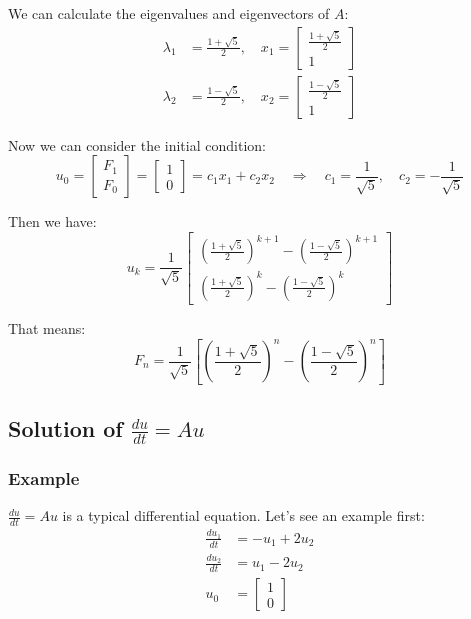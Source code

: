 \documentclass[12pt]{ctexart}
\begin{document}
We can calculate the eigenvalues and eigenvectors of $A$:
\begin{align*}
  \lambda_1 &= \frac{1 + \sqrt{5}}{2}, \quad
  x_1 = \begin{bmatrix}
    \frac{1 + \sqrt{5}}{2} \\
    1
  \end{bmatrix} \\
  \lambda_2 &= \frac{1 - \sqrt{5}}{2}, \quad
  x_2 = \begin{bmatrix}
    \frac{1 - \sqrt{5}}{2} \\
    1
  \end{bmatrix}
\end{align*}

Now we can consider the initial condition:
\[
  u_0 = \begin{bmatrix}
    F_1 \\
    F_0
  \end{bmatrix} =
  \begin{bmatrix}
    1 \\
    0
  \end{bmatrix} =
  c_1 x_1 + c_2 x_2
  \quad \Rightarrow \quad
  c_1 = \frac{1}{\sqrt{5}}, \quad c_2 = -\frac{1}{\sqrt{5}}
\]

Then we have:
\[
  u_k = \frac{1}{\sqrt{5}} \begin{bmatrix}
    \left(\frac{1 + \sqrt{5}}{2}\right)^{k+1} - \left(\frac{1 - \sqrt{5}}{2}\right)^{k+1} \\
    \left(\frac{1 + \sqrt{5}}{2}\right)^k - \left(\frac{1 - \sqrt{5}}{2}\right)^k
  \end{bmatrix}
\]

That means:
\[
  F_n = \frac{1}{\sqrt{5}} \left[
    \left(\frac{1 + \sqrt{5}}{2}\right)^n -
    \left(\frac{1 - \sqrt{5}}{2}\right)^n
  \right]
\]

\subsection{\textbf{Solution of $\frac{du}{dt} = Au$}}
\subsubsection{\textbf{Example}}

$\frac{du}{dt} = Au$ is a typical differential equation. Let's see an example first:
\begin{align*}
  \frac{du_1}{dt} &= -u_1 + 2u_2 \\
  \frac{du_2}{dt} &= u_1 - 2u_2 \\
  u_0 &= \begin{bmatrix} 1 \\ 0 \end{bmatrix}
\end{align*}
\end{document}
